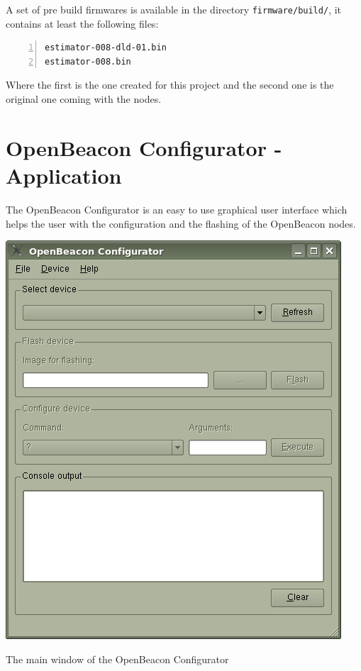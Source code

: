   A set of pre build firmwares is available in the directory \verb=firmware/build/=, it contains at least the following files:
  \begin{lstlisting}[frame=single,breaklines,basicstyle=\footnotesize,numbers=left,label=lst:manual:compilation:prebuildFirmwaresList,captionpos=b,caption={Pre-build OpenBeacon USB firmwares}]
estimator-008-dld-01.bin
estimator-008.bin
  \end{lstlisting}
  Where the first is the one created for this project and the second one is the original one coming with the nodes.

 \section{OpenBeacon Configurator - Application}
 \label{sec:manual:OBConfigurator}
  The OpenBeacon Configurator is an easy to use graphical user interface which helps the user with the configuration and the flashing of the OpenBeacon nodes.
  \begin{staticFigure}
   \begin{center}
     \includegraphics[scale=0.8]{images/UserManual/obConfig/mainWindow.png}
     \caption{The main window of the OpenBeacon Configurator}
     \label{fg:userManual:obConfig:mainWindow}
   \end{center}
  \end{staticFigure}

